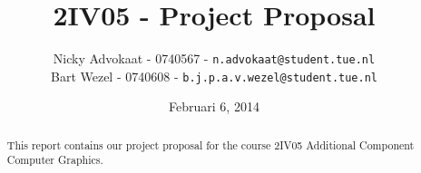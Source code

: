 \documentclass[a4paper,twoside,11pt]{article}
\title{\vspace{-\baselineskip}\sffamily\bfseries 2IV05 - Project Proposal}
\author{
Nicky Advokaat - 0740567 - {\tt n.advokaat@student.tue.nl} \\
Bart Wezel - 0740608 - {\tt b.j.p.a.v.wezel@student.tue.nl}\\
}
\date{Februari 6, 2014}
\numberwithin{equation}{section}
\begin{document}
\maketitle
\thispagestyle{empty}
\begin{abstract}
This report contains our project proposal  for the course 2IV05 Additional Component Computer Graphics.
\end{abstract}






\end{document}
